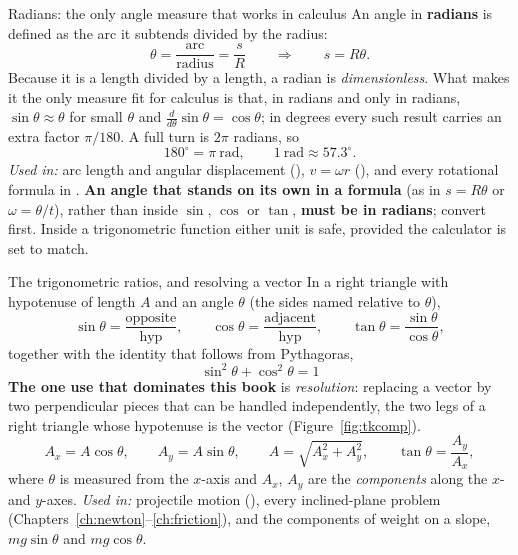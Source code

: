 \begin{defbox}{Radians: the only angle measure that works in calculus}
An angle in \textbf{radians} is defined as the arc it subtends divided by the radius:
\[
\theta=\frac{\text{arc}}{\text{radius}}=\frac{s}{R}\qquad\Longrightarrow\qquad s=R\theta.
\]
Because it is a length divided by a length, a radian is \emph{dimensionless}. What makes it the only
measure fit for calculus is that, in radians and only in radians, $\sin\theta\approx\theta$ for small
$\theta$ and $\frac{d}{d\theta}\sin\theta=\cos\theta$; in degrees every such result carries an extra
factor $\pi/180$. A full turn is $2\pi$ radians, so
\[
180^\circ=\pi\ \text{rad},\qquad 1\ \text{rad}\approx57.3^\circ.
\]
\emph{Used in:} arc length and angular displacement (), $v=\omega r$ (), and every
rotational formula in . \textbf{An angle that stands on its own in a
formula} (as in $s=R\theta$ or $\omega=\theta/t$), rather than inside $\sin$, $\cos$ or $\tan$,
\textbf{must be in radians}; convert first. Inside a trigonometric function either unit is safe,
provided the calculator is set to match.
\end{defbox}

\begin{defbox}{The trigonometric ratios, and resolving a vector}
In a right triangle with hypotenuse of length $A$ and an angle $\theta$ (the sides named relative to $\theta$),
\[
\sin\theta=\frac{\text{opposite}}{\text{hyp}},\qquad
\cos\theta=\frac{\text{adjacent}}{\text{hyp}},\qquad
\tan\theta=\frac{\sin\theta}{\cos\theta},
\]
together with the identity that follows from Pythagoras,
\[
\boxed{\;\sin^{2}\theta+\cos^{2}\theta=1\;}
\]
\textbf{The one use that dominates this book} is \emph{resolution}: replacing a vector by two
perpendicular pieces that can be handled independently, the two legs of a right triangle whose hypotenuse
is the vector (Figure~\ref{fig:tkcomp}).
\[
A_x=A\cos\theta,\qquad A_y=A\sin\theta,\qquad
A=\sqrt{A_x^{2}+A_y^{2}},\qquad \tan\theta=\frac{A_y}{A_x},
\]
where $\theta$ is measured from the $x$-axis and $A_x$, $A_y$ are the \emph{components} along the $x$- and
$y$-axes. \emph{Used in:} projectile motion (), every inclined-plane problem
(Chapters~\ref{ch:newton}--\ref{ch:friction}), and the components
of weight on a slope, $mg\sin\theta$ and $mg\cos\theta$.
\end{defbox}

\begin{figure}[htbp]
\centering
{}
\end{figure}

